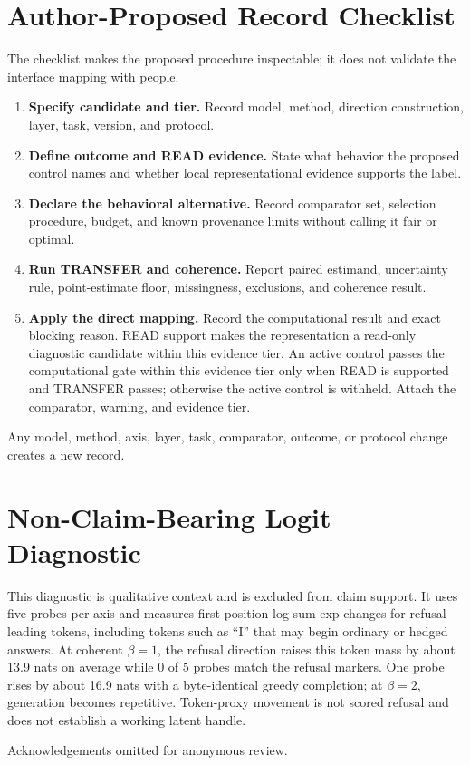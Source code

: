 \documentclass[manuscript,review,anonymous]{acmart}
\providecommand{\tightlist}{%
  \setlength{\itemsep}{0pt}\setlength{\parskip}{0pt}}
\begin{document}
\appendix

\section{Author-Proposed Record Checklist}\label{author-proposed-record-checklist}

The checklist makes the proposed procedure inspectable; it does not validate the interface mapping with people.

\begin{enumerate}
\def\labelenumi{\arabic{enumi}.}
\tightlist
\item
  \textbf{Specify candidate and tier.} Record model, method, direction construction, layer, task, version, and protocol.
\item
  \textbf{Define outcome and READ evidence.} State what behavior the proposed control names and whether local representational evidence supports the label.
\item
  \textbf{Declare the behavioral alternative.} Record comparator set, selection procedure, budget, and known provenance limits without calling it fair or optimal.
\item
  \textbf{Run TRANSFER and coherence.} Report paired estimand, uncertainty rule, point-estimate floor, missingness, exclusions, and coherence result.
\item
  \textbf{Apply the direct mapping.} Record the computational result and exact blocking reason. READ support makes the representation a read-only diagnostic candidate within this evidence tier. An active control passes the computational gate within this evidence tier only when READ is supported and TRANSFER passes; otherwise the active control is withheld. Attach the comparator, warning, and evidence tier.
\end{enumerate}

Any model, method, axis, layer, task, comparator, outcome, or protocol change creates a new record. {}%

\section{Non-Claim-Bearing Logit Diagnostic}\label{non-claim-bearing-logit-diagnostic}

This diagnostic is qualitative context and is excluded from claim support. It uses five probes per axis and measures first-position log-sum-exp changes for refusal-leading tokens, including tokens such as ``I'' that may begin ordinary or hedged answers. {}%
At coherent \(\beta=1\), the refusal direction raises this token mass by about 13.9 nats on average while 0 of 5 probes match the refusal markers. One probe rises by about 16.9 nats with a byte-identical greedy completion; at \(\beta=2\), generation becomes repetitive. {}%
{}%
Token-proxy movement is not scored refusal and does not establish a working latent handle.

\begin{acks}
Acknowledgements omitted for anonymous review.
\end{acks}



\end{document}

